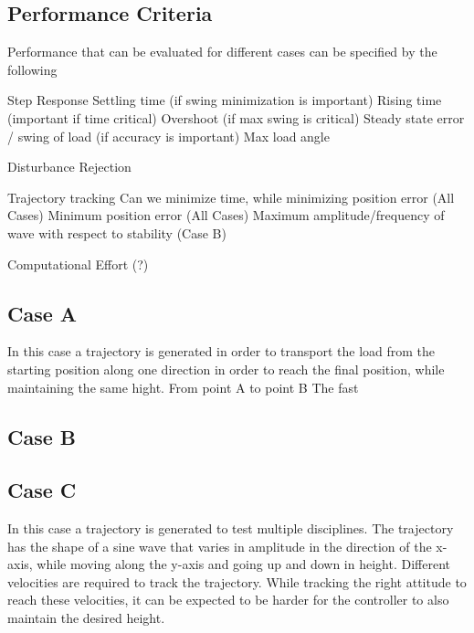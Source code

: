 \subsection{Performance Criteria}
Performance  that can be evaluated for different cases can be specified by the following
\begin{outline}
	\1 Step Response
	\2 Settling time (if swing minimization is important)
	\2 Rising time (important if time critical)
	\2 Overshoot (if max swing is critical)
	\2 Steady state error / swing of load (if accuracy is important)
	\2 Max load angle
	
	\1 Disturbance Rejection
	
	\1 Trajectory tracking
	\2 Can we minimize time, while minimizing position error (All Cases)
	\2 Minimum position error (All Cases)
	\2 Maximum amplitude/frequency of wave with respect to stability (Case B)
	
	\1 Computational Effort (?)
\end{outline}


\subsection{Case A}
In this case a trajectory is generated in order to transport the load from the starting position along one direction in order to reach the final position, while maintaining the same hight. 
From point A to point B
The fast


\subsection{Case B}


\subsection{Case C}
In this case a trajectory is generated to test multiple disciplines. 
The trajectory has the shape of a sine wave that varies in amplitude in the direction of the x-axis, while moving along the y-axis and going up and down in height.
Different velocities are required to track the trajectory. While tracking the right  attitude to reach these velocities, it can be expected to be harder for the controller to also maintain the desired height. 

